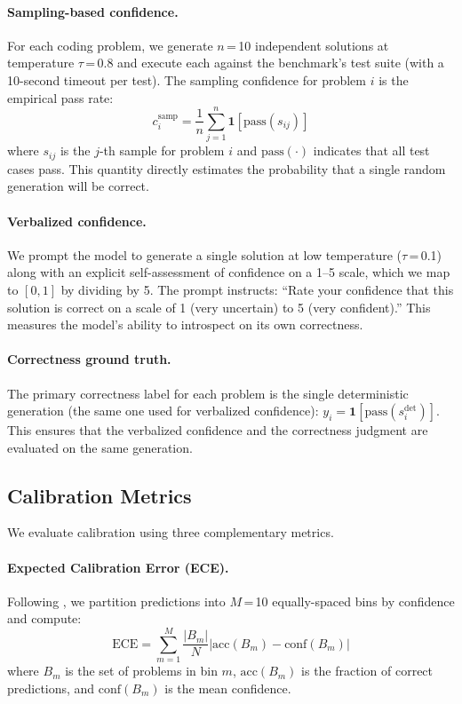 \documentclass{article}
\begin{document}
\paragraph{Sampling-based confidence.}
For each coding problem, we generate $n$\,=\,10 independent solutions at temperature $\tau$\,=\,0.8 and execute each against the benchmark's test suite (with a 10-second timeout per test). The sampling confidence for problem $i$ is the empirical pass rate:
\begin{equation}
  c_i^{\text{samp}} = \frac{1}{n}\sum_{j=1}^{n} \mathbf{1}[\text{pass}(s_{ij})]
  \label{eq:sampling}
\end{equation}
where $s_{ij}$ is the $j$-th sample for problem $i$ and $\text{pass}(\cdot)$ indicates that all test cases pass. This quantity directly estimates the probability that a single random generation will be correct.

\paragraph{Verbalized confidence.}
We prompt the model to generate a single solution at low temperature ($\tau$\,=\,0.1) along with an explicit self-assessment of confidence on a 1--5 scale, which we map to $[0,1]$ by dividing by 5. The prompt instructs: ``Rate your confidence that this solution is correct on a scale of 1 (very uncertain) to 5 (very confident).'' This measures the model's ability to introspect on its own correctness.

\paragraph{Correctness ground truth.}
The primary correctness label for each problem is the single deterministic generation (the same one used for verbalized confidence): $y_i = \mathbf{1}[\text{pass}(s_i^{\text{det}})]$. This ensures that the verbalized confidence and the correctness judgment are evaluated on the same generation.

\subsection{Calibration Metrics}
\label{sec:metrics}

We evaluate calibration using three complementary metrics.

\paragraph{Expected Calibration Error (ECE).}
Following \citet{naeini2015obtaining}, we partition predictions into $M$\,=\,10 equally-spaced bins by confidence and compute:
\begin{equation}
  \text{ECE} = \sum_{m=1}^{M} \frac{|B_m|}{N} \left| \text{acc}(B_m) - \text{conf}(B_m) \right|
  \label{eq:ece}
\end{equation}
where $B_m$ is the set of problems in bin $m$, $\text{acc}(B_m)$ is the fraction of correct predictions, and $\text{conf}(B_m)$ is the mean confidence.
\end{document}
